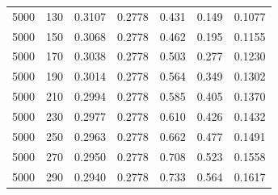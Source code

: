 \begin{tabular}{rrrrrrr}
  5000 & 130 & 0.3107 & 0.2778 & 0.431 & 0.149 & 0.1077 \\ 
  5000 & 150 & 0.3068 & 0.2778 & 0.462 & 0.195 & 0.1155 \\ 
  5000 & 170 & 0.3038 & 0.2778 & 0.503 & 0.277 & 0.1230 \\ 
  5000 & 190 & 0.3014 & 0.2778 & 0.564 & 0.349 & 0.1302 \\ 
  5000 & 210 & 0.2994 & 0.2778 & 0.585 & 0.405 & 0.1370 \\ 
  5000 & 230 & 0.2977 & 0.2778 & 0.610 & 0.426 & 0.1432 \\ 
  5000 & 250 & 0.2963 & 0.2778 & 0.662 & 0.477 & 0.1491 \\ 
  5000 & 270 & 0.2950 & 0.2778 & 0.708 & 0.523 & 0.1558 \\ 
  5000 & 290 & 0.2940 & 0.2778 & 0.733 & 0.564 & 0.1617 \\ 
   \hline
\end{tabular}
